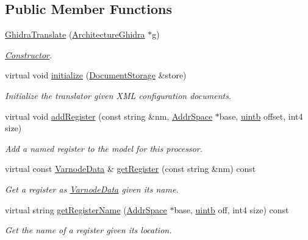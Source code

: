 \subsection*{Public Member Functions}
\begin{DoxyCompactItemize}
\item 
\mbox{\hyperlink{class_ghidra_translate_a2f61a23911f8dc1d08527b6ccf199a12}{Ghidra\+Translate}} (\mbox{\hyperlink{class_architecture_ghidra}{Architecture\+Ghidra}} $\ast$g)
\begin{DoxyCompactList}\small\item\em \mbox{\hyperlink{class_constructor}{Constructor}}. \end{DoxyCompactList}\item 
virtual void \mbox{\hyperlink{class_ghidra_translate_a9a2e9180ab58ec05380f62009a7822c6}{initialize}} (\mbox{\hyperlink{class_document_storage}{Document\+Storage}} \&store)
\begin{DoxyCompactList}\small\item\em Initialize the translator given X\+ML configuration documents. \end{DoxyCompactList}\item 
virtual void \mbox{\hyperlink{class_ghidra_translate_aa55013b7e45386ecf012cae6378950fa}{add\+Register}} (const string \&nm, \mbox{\hyperlink{class_addr_space}{Addr\+Space}} $\ast$base, \mbox{\hyperlink{types_8h_a2db313c5d32a12b01d26ac9b3bca178f}{uintb}} offset, int4 size)
\begin{DoxyCompactList}\small\item\em Add a named register to the model for this processor. \end{DoxyCompactList}\item 
virtual const \mbox{\hyperlink{struct_varnode_data}{Varnode\+Data}} \& \mbox{\hyperlink{class_ghidra_translate_a81e1af3292005903279e80a61a6ccfac}{get\+Register}} (const string \&nm) const
\begin{DoxyCompactList}\small\item\em Get a register as \mbox{\hyperlink{struct_varnode_data}{Varnode\+Data}} given its name. \end{DoxyCompactList}\item 
virtual string \mbox{\hyperlink{class_ghidra_translate_a62652735dff5298e4c8bae0872d7e7cb}{get\+Register\+Name}} (\mbox{\hyperlink{class_addr_space}{Addr\+Space}} $\ast$base, \mbox{\hyperlink{types_8h_a2db313c5d32a12b01d26ac9b3bca178f}{uintb}} off, int4 size) const
\begin{DoxyCompactList}\small\item\em Get the name of a register given its location. \end{DoxyCompactList}\item 

\end{DoxyCompactItemize}
